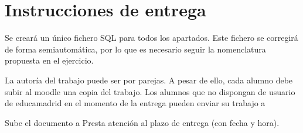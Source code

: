 \section{Instrucciones de entrega}
Se creará un único fichero SQL para todos los apartados. Este fichero se corregirá de forma semiautomática, por lo que es necesario seguir la nomenclatura propuesta en el ejercicio.

La autoría del trabajo puede ser por parejas. A pesar de ello, cada alumno debe subir al moodle una copia del trabajo. Los alumnos que no dispongan de usuario de educamadrid en el momento de la entrega pueden enviar su trabajo a 


Sube el documento a 
Presta atención al plazo de entrega (con fecha y hora).
  






